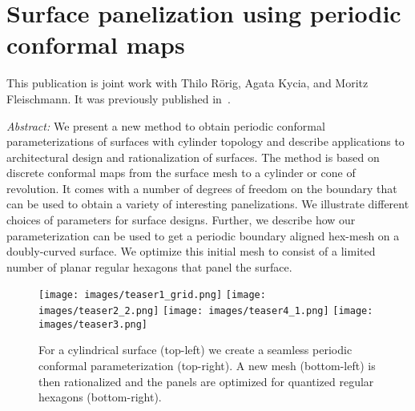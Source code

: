 \documentclass[Thesis.tex]{subfiles}
\begin{document}
\chapter{Surface panelization using periodic conformal maps}

This publication is joint work with Thilo R\"orig, Agata Kycia, and 
Moritz Fleischmann. It was previously published in~\cite{Roerig2014}.

\emph{Abstract:} 
We present a new method to obtain periodic conformal parameterizations of
surfaces with cylinder topology and describe applications to
architectural design and rationalization of surfaces. The method is
based on discrete conformal maps from the surface mesh to a cylinder or
cone of revolution. It comes with a number of degrees of freedom on
the boundary that can be used to obtain a variety of interesting
panelizations. We illustrate different choices of parameters for
\nurbs surface designs. Further, we describe how our parameterization
can be used to get a periodic boundary aligned hex-mesh on a
doubly-curved surface. We optimize this initial mesh to consist of a
limited number of planar regular hexagons that panel the surface.

\begin{figure}
  \centering
  \texttt{[image: images/teaser1\_grid.png]}
  \texttt{[image: images/teaser2\_2.png]}
  \texttt{[image: images/teaser4\_1.png]}
  \texttt{[image: images/teaser3.png]}
  \caption{For a cylindrical \nurbs surface (top-left) we create a
    seamless periodic conformal parameterization (top-right). A new
    mesh (bottom-left) is then rationalized and the panels are
    optimized for quantized regular hexagons (bottom-right).}
  \label{fig:teaser}
\end{figure}

\def\subfilebibliography{}









\subfilebibliographytwo
\end{document}
